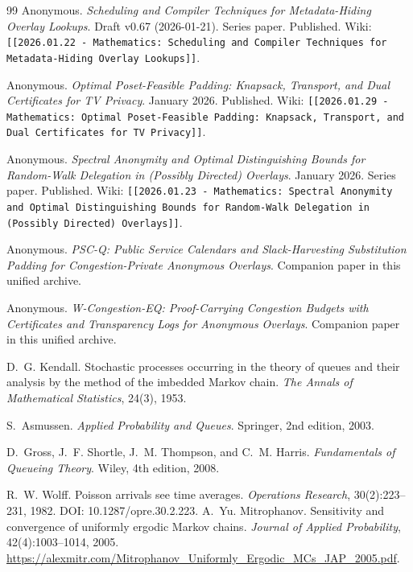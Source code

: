 \documentclass[11pt]{article}
\theoremstyle{definition}
\theoremstyle{remark}
\begin{document}
\begin{thebibliography}{99}
Anonymous.
\newblock \emph{Scheduling and Compiler Techniques for Metadata-Hiding Overlay Lookups}.
\newblock Draft v0.67 (2026-01-21). Series paper.
\newblock Published. Wiki: \texttt{[[2026.01.22 - Mathematics: Scheduling and Compiler Techniques for Metadata-Hiding Overlay Lookups]]}.

Anonymous.
\newblock \emph{Optimal Poset-Feasible Padding: Knapsack, Transport, and Dual Certificates for TV Privacy}.
\newblock January 2026. Published. Wiki: \texttt{[[2026.01.29 - Mathematics: Optimal Poset-Feasible Padding: Knapsack, Transport, and Dual Certificates for TV Privacy]]}.

Anonymous.
\newblock \emph{Spectral Anonymity and Optimal Distinguishing Bounds for Random-Walk Delegation in (Possibly Directed) Overlays}.
\newblock January 2026. Series paper.
\newblock Published. Wiki: \texttt{[[2026.01.23 - Mathematics: Spectral Anonymity and Optimal Distinguishing Bounds for Random-Walk Delegation in (Possibly Directed) Overlays]]}.

Anonymous.
\newblock \emph{PSC-Q: Public Service Calendars and Slack-Harvesting Substitution Padding for Congestion-Private Anonymous Overlays}.
\newblock Companion paper in this unified archive.

Anonymous.
\newblock \emph{W-Congestion-EQ: Proof-Carrying Congestion Budgets with Certificates and Transparency Logs for Anonymous Overlays}.
\newblock Companion paper in this unified archive.

D.~G. Kendall.
\newblock Stochastic processes occurring in the theory of queues and their analysis by the method of the imbedded Markov chain.
\newblock \emph{The Annals of Mathematical Statistics}, 24(3), 1953.

S.~Asmussen.
\newblock \emph{Applied Probability and Queues}.
\newblock Springer, 2nd edition, 2003.


D.~Gross, J.~F. Shortle, J.~M. Thompson, and C.~M. Harris.
\newblock \emph{Fundamentals of Queueing Theory}.
\newblock Wiley, 4th edition, 2008.

R.~W. Wolff.
\newblock Poisson arrivals see time averages.
\newblock \emph{Operations Research}, 30(2):223--231, 1982.
\newblock DOI: 10.1287/opre.30.2.223.
A.~Yu. Mitrophanov.
\newblock Sensitivity and convergence of uniformly ergodic Markov chains.
\newblock \emph{Journal of Applied Probability}, 42(4):1003--1014, 2005.
\newblock \url{https://alexmitr.com/Mitrophanov_Uniformly_Ergodic_MCs_JAP_2005.pdf}.


\end{thebibliography}
\end{document}
